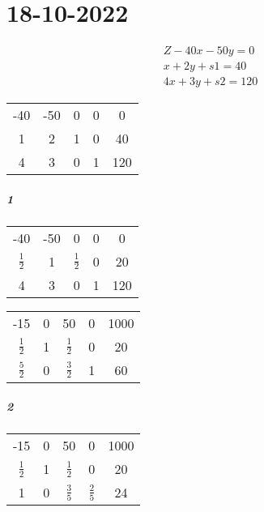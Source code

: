 \chapter{18-10-2022}

\begin{align}
    \text{$Z - 40x - 50y = 0$} \\
    \text{$x + 2y + s1 = 40$} \\
    \text{$4x + 3y + s2 = 120$}
\end{align}

\begin{center}
    \begin{tabular}{|c|c|c|c|c|}
        -40 & -50 & 0 & 0 & 0 \\
        1 & 2 & 1 & 0 & 40 \\
        4 & 3 & 0 & 1 & 120 \\
    \end{tabular}
\end{center}

\paragraph{1}

\begin{center}
    \begin{tabular}{|c|c|c|c|c|}
        -40 & -50 & 0 & 0 & 0 \\
        $\frac 1 2$ & 1 & $\frac 1 2$ & 0 & 20 \\
        4 & 3 & 0 & 1 & 120 \\
    \end{tabular}
\end{center}

\begin{center}
    \begin{tabular}{|c|c|c|c|c|}
        -15 & 0 & 50 & 0 & 1000 \\
        $\frac 1 2$ & 1 & $\frac 1 2$ & 0 & 20 \\
        $\frac 5 2$ & 0 & $\frac 3 2$ & 1 & 60 \\
    \end{tabular}
\end{center}

\paragraph{2}

\begin{center}
    \begin{tabular}{|c|c|c|c|c|}
        -15 & 0 & 50 & 0 & 1000 \\
        $\frac 1 2$ & 1 & $\frac 1 2$ & 0 & 20 \\
        1 & 0 & $\frac 3 5$ & $\frac 2 5$ & 24 \\
    \end{tabular}
\end{center}


